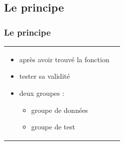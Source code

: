 \documentclass[handout]{beamer}
\begin{document}
	\subsection{Le principe}
		\begin{frame}
		\frametitle{Le principe}
		\begin{tabular}{l l}
			\begin{minipage}{0.2\textwidth}
				\begin{center}
				\end{center}
			\end{minipage}

			\begin{minipage}{0.8\textwidth}
				\begin{itemize}
					\item après avoir trouvé la fonction
					\item tester sa validité
					\item deux groupes :
						\begin{itemize}
							\item groupe de données
							\item groupe de test
						\end{itemize}
				\end{itemize}
			\end{minipage}
			
		\end{tabular}
		\end{frame}
\end{document}
